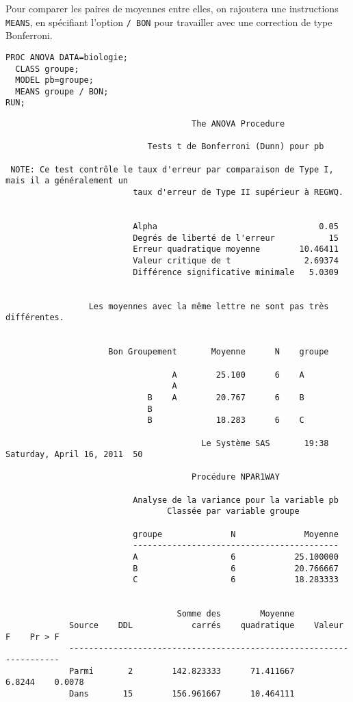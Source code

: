 Pour comparer les paires de moyennes entre elles, on rajoutera une
instructions \texttt{MEANS}, en spécifiant l'option \verb|/ BON| pour
travailler avec une correction de type Bonferroni.
\begin{verbatim}
PROC ANOVA DATA=biologie; 
  CLASS groupe; 
  MODEL pb=groupe;
  MEANS groupe / BON;
RUN;
\end{verbatim}

\begin{verbatim}
                                      The ANOVA Procedure

                             Tests t de Bonferroni (Dunn) pour pb

 NOTE: Ce test contrôle le taux d'erreur par comparaison de Type I, mais il a généralement un
                          taux d'erreur de Type II supérieur à REGWQ.


                          Alpha                                 0.05
                          Degrés de liberté de l'erreur           15
                          Erreur quadratique moyenne        10.46411
                          Valeur critique de t               2.69374
                          Différence significative minimale   5.0309


                 Les moyennes avec la même lettre ne sont pas très différentes.


                     Bon Groupement       Moyenne      N    groupe

                                  A        25.100      6    A
                                  A
                             B    A        20.767      6    B
                             B
                             B             18.283      6    C

                                        Le Système SAS       19:38 Saturday, April 16, 2011  50

                                      Procédure NPAR1WAY

                          Analyse de la variance pour la variable pb
                                 Classée par variable groupe

                          groupe              N              Moyenne
                          ------------------------------------------
                          A                   6            25.100000
                          B                   6            20.766667
                          C                   6            18.283333


                                   Somme des        Moyenne
             Source    DDL            carrés    quadratique    Valeur F    Pr > F
             --------------------------------------------------------------------
             Parmi       2        142.823333      71.411667      6.8244    0.0078
             Dans       15        156.961667      10.464111
\end{verbatim}

